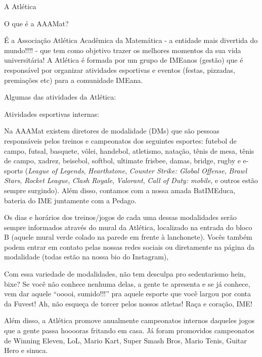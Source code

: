 \begin{secao}{A Atlética} %

\begin{subsecao}{O que é a AAAMat?}

É a Associação Atlética Acadêmica da Matemática - a entidade mais divertida do
mundo!!!! - que tem como objetivo trazer os melhores momentos da sua vida
universitária! A Atlética é formada por um grupo de IMEanos (gestão) que é
responsável por organizar atividades esportivas e eventos (festas, pizzadas,
premiações etc) para a comunidade IMEana.

\end{subsecao}

Algumas das atividades da Atlética:

\begin{subsecao}{Atividades esportivas internas:}

Na AAAMat existem diretores de modalidade (DMs) que são pessoas responsáveis
pelos treinos e campeonatos dos seguintes esportes: futebol de campo, futsal,
basquete, vôlei, handebol, atletismo, natação, tênis de mesa, tênis de campo,
xadrez, beisebol, softbol, ultimate frisbee, damas, bridge,
rugby e e-sports (\textit{League of Legends}, \textit{Hearthstone},
\textit{Counter Strike: Global Offense}, \textit{Brawl Stars},
\textit{Rocket League}, \textit{Clash Royale}, \textit{Valorant},
\textit{Call of Duty: mobile}, e outros estão sempre surgindo). Além disso,
contamos com a nossa amada BatIMEduca, bateria do IME juntamente com a Pedago.

Os dias e horários dos treinos/jogos de cada uma dessas modalidades serão
sempre informados através do mural da Atlética, localizado na entrada
do bloco B (aquele mural verde colado na parede em frente à lanchonete).
Vocês também podem entrar em contato pelas nossas redes sociais ou diretamente
na página da modalidade (todas estão na nossa bio do Instagram),

Com essa variedade de modalidades, não tem desculpa pro sedentarismo hein,
bixe? Se você não conhece nenhuma delas, a gente te apresenta e se já conhece,
vem dar aquele “ooooi, sumido!!!” pra aquele esporte que você largou por conta
da Fuvest! Ah, não esqueça de torcer pelos nossos atletas! Raça e coração, IME!

Além disso, a Atlética promove anualmente campeonatos internos daqueles jogos
que a gente passa hooooras fritando em casa. Já foram promovidos campeonatos de
Winning Eleven, LoL, Mario Kart, Super Smash Bros, Mario Tenis, Guitar Hero e
sinuca.


\end{subsecao}
\end{secao}
